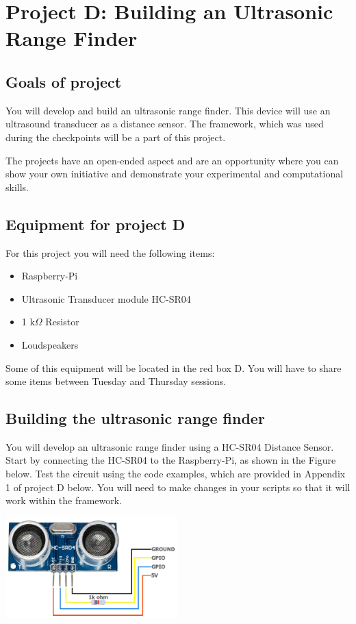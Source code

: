 
 \newpage
\section{Project D: Building an Ultrasonic Range Finder}

\subsection{Goals of project}

You will develop and build an ultrasonic range finder. This device will use an ultrasound transducer as a distance sensor. The \webiopi framework, which was used during the checkpoints will be a part of this project. 

The projects have an open-ended aspect and are an opportunity where you can show your own initiative and demonstrate your experimental and computational skills. 

\subsection{Equipment for project D}

For this project you will need the following items:
\begin{itemize}
\item Raspberry-Pi
\item Ultrasonic Transducer module HC-SR04
\item 1 k$\Omega$ Resistor
\item Loudspeakers
\end{itemize}
Some of this equipment will be located in the red box D. You will have to share some items between Tuesday and Thursday sessions. 


\subsection{Building the ultrasonic range finder}
 
You will develop an ultrasonic range finder using a HC-SR04 Distance Sensor. 
Start by connecting the HC-SR04 to the Raspberry-Pi, as shown in the Figure below. Test the circuit using the code examples, which are provided in Appendix 1 of project D below. 
You will need to make changes in your scripts  so that it will work within the \webiopi framework.

\begin{center}                                        
 {\includegraphics[width=0.50\textwidth]{figs/hcsr04.png}}
 \end{center}



